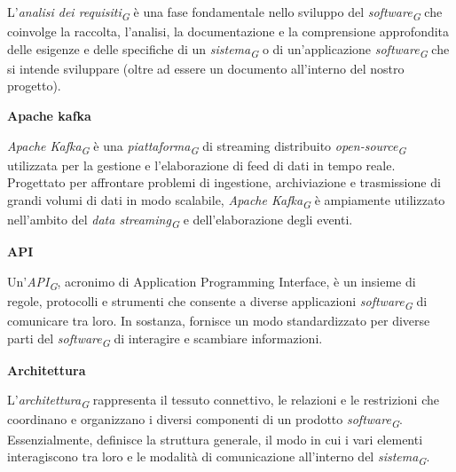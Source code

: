 \documentclass{article}
\begin{document}
\vspace{0.1cm}

L'\textit{analisi dei requisiti}\textsubscript{\textit{G}} è una fase fondamentale nello sviluppo del \textit{software}\textsubscript{\textit{G}} che coinvolge la raccolta, l'analisi, la documentazione e la comprensione approfondita delle esigenze e delle specifiche di un \textit{sistema}\textsubscript{\textit{G}} o di un'applicazione \textit{software}\textsubscript{\textit{G}} che si intende sviluppare (oltre ad essere un documento all’interno del nostro progetto).

\vspace{0.4cm}

\textbf{Apache kafka}

\vspace{0.1cm}

\textit{Apache Kafka}\textsubscript{\textit{G}} è una \textit{piattaforma}\textsubscript{\textit{G}} di streaming distribuito \textit{open-source}\textsubscript{\textit{G}} utilizzata per la gestione e l'elaborazione di feed di dati in tempo reale. Progettato per affrontare problemi di ingestione, archiviazione e trasmissione di grandi volumi di dati in modo scalabile, \textit{Apache Kafka}\textsubscript{\textit{G}} è ampiamente utilizzato nell'ambito del \textit{data streaming}\textsubscript{\textit{G}} e dell'elaborazione degli eventi.

\vspace{0.4cm}

\textbf{API}

\vspace{0.1cm}

Un'\textit{API}\textsubscript{\textit{G}}, acronimo di Application Programming Interface, è un insieme di regole, protocolli e strumenti che consente a diverse applicazioni \textit{software}\textsubscript{\textit{G}} di comunicare tra loro. In sostanza, fornisce un modo standardizzato per diverse parti del \textit{software}\textsubscript{\textit{G}} di interagire e scambiare informazioni.

\vspace{0.4cm}

\textbf{Architettura}

\vspace{0.1cm}

L'\textit{architettura}\textsubscript{\textit{G}} rappresenta il tessuto connettivo, le relazioni e le restrizioni che coordinano e organizzano i diversi componenti di un prodotto \textit{software}\textsubscript{\textit{G}}. Essenzialmente, definisce la struttura generale, il modo in cui i vari elementi interagiscono tra loro e le modalità di comunicazione all'interno del \textit{sistema}\textsubscript{\textit{G}}.
\end{document}
